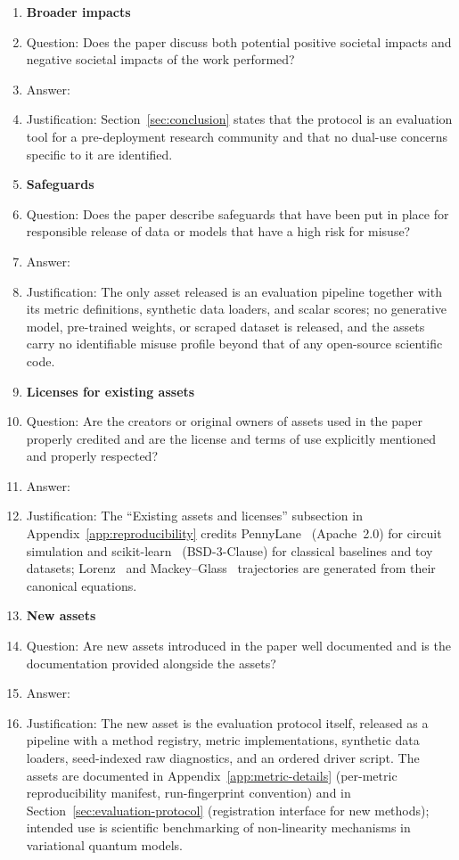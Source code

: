 \begin{enumerate}
\item {\bf Broader impacts}
    \item[] Question: Does the paper discuss both potential positive societal impacts and negative societal impacts of the work performed?
    \item[] Answer: \answerYes{}
    \item[] Justification: Section~\ref{sec:conclusion} states that the protocol is an evaluation tool for a pre-deployment research community and that no dual-use concerns specific to it are identified.

\item {\bf Safeguards}
    \item[] Question: Does the paper describe safeguards that have been put in place for responsible release of data or models that have a high risk for misuse?
    \item[] Answer: \answerNA{}
    \item[] Justification: The only asset released is an evaluation pipeline together with its metric definitions, synthetic data loaders, and scalar scores; no generative model, pre-trained weights, or scraped dataset is released, and the assets carry no identifiable misuse profile beyond that of any open-source scientific code.

\item {\bf Licenses for existing assets}
    \item[] Question: Are the creators or original owners of assets used in the paper properly credited and are the license and terms of use explicitly mentioned and properly respected?
    \item[] Answer: \answerYes{}
    \item[] Justification: The ``Existing assets and licenses'' subsection in Appendix~\ref{app:reproducibility} credits PennyLane~\citep{bergholm2018pennylane} (Apache~2.0) for circuit simulation and scikit-learn~\citep{pedregosa2011scikitlearn} (BSD-3-Clause) for classical baselines and toy datasets; Lorenz~\citep{lorenz1963} and Mackey--Glass~\citep{mackeyglass1977} trajectories are generated from their canonical equations.

\item {\bf New assets}
    \item[] Question: Are new assets introduced in the paper well documented and is the documentation provided alongside the assets?
    \item[] Answer: \answerYes{}
    \item[] Justification: The new asset is the evaluation protocol itself, released as a pipeline with a method registry, metric implementations, synthetic data loaders, seed-indexed raw diagnostics, and an ordered driver script. The assets are documented in Appendix~\ref{app:metric-details} (per-metric reproducibility manifest, run-fingerprint convention) and in Section~\ref{sec:evaluation-protocol} (registration interface for new methods); intended use is scientific benchmarking of non-linearity mechanisms in variational quantum models.


\end{enumerate}
